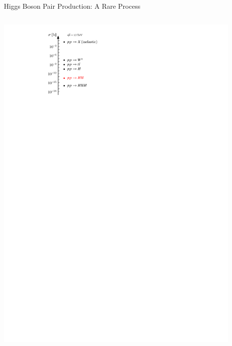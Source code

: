 \documentclass[11pt, xcolor={dvipsnames}, aspectratio=169]{beamer}
\begin{document}
\begin{frame}{Higgs Boson Pair Production: A Rare Process}

  \begin{columns}
    \centering

    \vspace*{1em} \includegraphics[width=0.92\textwidth]{cross_section_figure}


\end{columns}
\end{frame}
\end{document}
